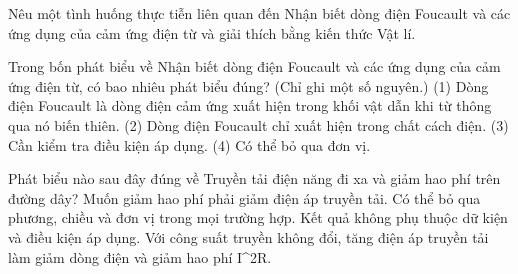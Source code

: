 \begin{bt}
Nêu một tình huống thực tiễn liên quan đến Nhận biết dòng điện Foucault và các ứng dụng của cảm ứng điện từ và giải thích bằng kiến thức Vật lí.
\end{bt}

\begin{ex}
Trong bốn phát biểu về Nhận biết dòng điện Foucault và các ứng dụng của cảm ứng điện từ, có bao nhiêu phát biểu đúng? (Chỉ ghi một số nguyên.) (1) Dòng điện Foucault là dòng điện cảm ứng xuất hiện trong khối vật dẫn khi từ thông qua nó biến thiên. (2) Dòng điện Foucault chỉ xuất hiện trong chất cách điện. (3) Cần kiểm tra điều kiện áp dụng. (4) Có thể bỏ qua đơn vị.
\end{ex}

\begin{ex}
Phát biểu nào sau đây đúng về Truyền tải điện năng đi xa và giảm hao phí trên đường dây?
\choice
{Muốn giảm hao phí phải giảm điện áp truyền tải.}
{Có thể bỏ qua phương, chiều và đơn vị trong mọi trường hợp.}
{Kết quả không phụ thuộc dữ kiện và điều kiện áp dụng.}
{\True Với công suất truyền không đổi, tăng điện áp truyền tải làm giảm dòng điện và giảm hao phí I^2R.}
\end{ex}

